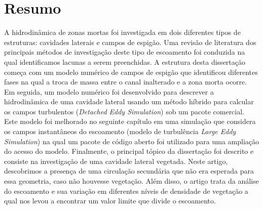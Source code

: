 \chapter*{Resumo}
A hidrodinâmica de zonas mortas foi investigada em dois diferentes tipos de estruturas: cavidades laterais e campos de espigão. Uma revisão de literatura dos principais métodos de investigação deste tipo de escoamento foi conduzida na qual identificamos lacunas a serem preenchidas. A estrutura desta dissertação começa com um modelo numérico de campos de espigão que identificou diferentes fases na qual a troca de massa entre o canal inalterado e a zona morta ocorre. Em seguida, um modelo numérico foi desenvolvido para descrever a hidrodinâmica de uma cavidade lateral usando um método híbrido para calcular os campos turbulentos (\textit{Detached Eddy Simulation}) sob um pacote comercial. Este modelo foi melhorado no seguinte capítulo em uma simulação que considera os campos instantâneos do escoamento (modelo de turbulência \textit{Large Eddy Simulation}) na qual um pacote de código aberto foi utilizado para uma ampliação do acesso do modelo. Finalmente, o principal tópico da dissertação foi descrito e consiste na investigação de uma cavidade lateral vegetada. Neste artigo, descobrimos a presença de uma circulação secundária que não era esperada para essa geometria, caso não houvesse vegetação. Além disso, o artigo trata da análise do escoamento e sua variação em diferentes níveis de densidade de vegetação a qual nos levou a encontrar um valor limite que divide o escoamento.
